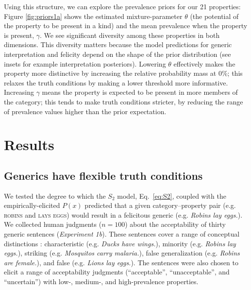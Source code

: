 \documentclass{pnastwo}
\begin{document}
\begin{article}
Using this structure, we can explore the prevalence priors for our 21 properties:
Figure \ref{fig:priors1a} shows the estimated mixture-parameter $\theta$ (the potential of the property to be present in a kind) and the mean prevalence when the property is present, $\gamma$. 
We see significant diversity among these properties in both dimensions. 
This diversity matters because the model predictions for generic interpretation and felicity depend on the shape of the prior distribution (see insets for example interpretation posteriors).
Lowering $\theta$ effectively makes the property more distinctive by increasing the relative probability mass at 0\%; this relaxes the truth conditions by making a lower threshold more informative.
Increasing $\gamma$ means the property is expected to be present in more members of the category; this tends to make truth conditions stricter, by reducing the range of prevalence values higher than the prior expectation. 


\section{Results}

\subsection{Generics have flexible truth conditions}
We tested the degree to which the $S_2$ model, Eq.~\ref{eq:S2}, coupled with the empirically-elicited $P(x)$ predicted that a given category--property pair (e.g. \textsc{robins} and \textsc{lays eggs}) would result in a felicitous generic (e.g. \emph{Robins lay eggs.}). 
We collected human judgments ($n=100$) about the acceptability of thirty generic sentences ({\it Experiment 1b}). 
These sentences cover a range of conceptual distinctions  \cite{Prasada2013}: characteristic (e.g. \emph{Ducks have wings.}), minority (e.g. \emph{Robins lay eggs.}), striking (e.g. \emph{Mosquitos carry malaria.}), false generalization (e.g. \emph{Robins are female.}), and false (e.g. \emph{Lions lay eggs.}).
The sentences were also chosen to elicit a range of acceptability judgments (``acceptable'', ``unacceptable'', and ``uncertain'') with low-, medium-, and high-prevalence properties.
%


\end{article}
\end{document}
